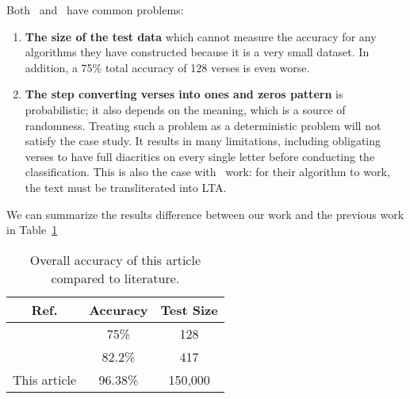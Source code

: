 Both~\cite{Abuata2016RuleBasedAlgorithm} and~\cite{Alnagdawi2013FindingArabicPoemMeter} have common problems:

\begin{enumerate}
\item \textbf{The size of the test data} which cannot measure the accuracy for any algorithms they have constructed because it is a very small dataset. In addition, a 75\% total accuracy of 128 verses is even worse.
\item \textbf{The step converting verses into ones and zeros pattern} is probabilistic; it also depends on the meaning, which is a source of randomness. Treating such a problem as a deterministic problem will not satisfy the case study. It results in many limitations, including obligating verses to have full diacritics on every single letter before conducting the classification. This is also the case with~\cite{Kurt2012AlgorithmForDetectionAnalysis} work: for their algorithm to work, the text must be transliterated into LTA.
\end{enumerate}

We can summarize the results difference between our work and the previous work in Table~\ref{Tab:Summary_Results}

\begin{table}[h]
\centering
\begin{tabular}{c c c}
\toprule
\textbf{Ref.}& \textbf{Accuracy}& \textbf{Test Size} \\
\midrule
\cite{Alnagdawi2013FindingArabicPoemMeter} & 75\% & 128\\
\cite{Abuata2016RuleBasedAlgorithm}& 82.2\% & 417\\
This article & 96.38\%& 150,000 \\
\bottomrule
\end{tabular}
\caption{Overall accuracy of this article compared to literature.}\label{Tab:Summary_Results}
\end{table}




